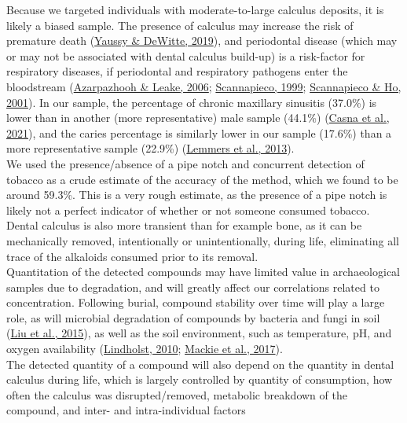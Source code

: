 \documentclass[
  b5paper,
]{book}
\begin{document}
Because we targeted individuals with moderate-to-large calculus
deposits, it is likely a biased sample. The presence of calculus may
increase the risk of premature death
(\protect\hyperlink{ref-yaussyCalculusSurvivorship2019}{Yaussy \&
DeWitte, 2019}), and periodontal disease (which may or may not be
associated with dental calculus build-up) is a risk-factor for
respiratory diseases, if periodontal and respiratory pathogens enter the
bloodstream
(\protect\hyperlink{ref-azarpazhoohSystematicReview2006}{Azarpazhooh \&
Leake, 2006};
\protect\hyperlink{ref-scannapiecoRoleOral1999}{Scannapieco, 1999};
\protect\hyperlink{ref-scannapiecoPotentialAssociations2001}{Scannapieco
\& Ho, 2001}). In our sample, the percentage of chronic maxillary
sinusitis (37.0\%) is lower than in another (more representative) male
sample (44.1\%)
(\protect\hyperlink{ref-casnaUrbanizationRespiratory2021}{Casna et al.,
2021}), and the caries percentage is similarly lower in our sample
(17.6\%) than a more representative sample (22.9\%)
(\protect\hyperlink{ref-lemmersMiddenbeemster2013}{Lemmers et al.,
2013}).\\
We used the presence/absence of a pipe notch and concurrent detection of
tobacco as a crude estimate of the accuracy of the method, which we
found to be around 59.3\%. This is a very rough estimate, as the
presence of a pipe notch is likely not a perfect indicator of whether or
not someone consumed tobacco. Dental calculus is also more transient
than for example bone, as it can be mechanically removed, intentionally
or unintentionally, during life, eliminating all trace of the alkaloids
consumed prior to its removal.\\
Quantitation of the detected compounds may have limited value in
archaeological samples due to degradation, and will greatly affect our
correlations related to concentration. Following burial, compound
stability over time will play a large role, as will microbial
degradation of compounds by bacteria and fungi in soil
(\protect\hyperlink{ref-liuNicotinedegradingMicroorganisms2015}{Liu et
al., 2015}), as well as the soil environment, such as temperature, pH,
and oxygen availability
(\protect\hyperlink{ref-lindholstLongTerm2010}{Lindholst, 2010};
\protect\hyperlink{ref-mackiePreservationMetaproteome2017}{Mackie et
al., 2017}).\\
The detected quantity of a compound will also depend on the quantity in
dental calculus during life, which is largely controlled by quantity of
consumption, how often the calculus was disrupted/removed, metabolic
breakdown of the compound, and inter- and intra-individual factors
\end{document}
